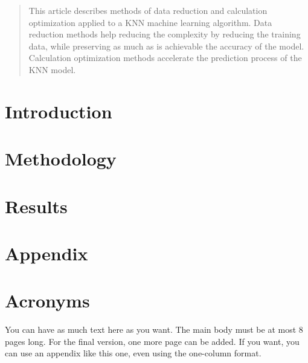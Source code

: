 	\begin{abstract}
		This article describes methods of data reduction and calculation optimization applied to a \ac{KNN} machine learning algorithm. Data reduction methods help reducing the complexity by reducing the training data, while preserving as much as is achievable the accuracy of the model. Calculation optimization methods accelerate the prediction process of the \ac{KNN} model.
	\end{abstract}
	
	\section{Introduction}
	
	\section{Methodology}
	
	\section{Results}
	
	
	
	\newpage
	\onecolumn
	\section{Appendix}
	\appendix
	
	\section{Acronyms}
	\begin{acronym}[CNN]
	\end{acronym}
	
	You can have as much text here as you want. The main body must be at most $8$ pages long.
	For the final version, one more page can be added.
	If you want, you can use an appendix like this one, even using the one-column format.
	
